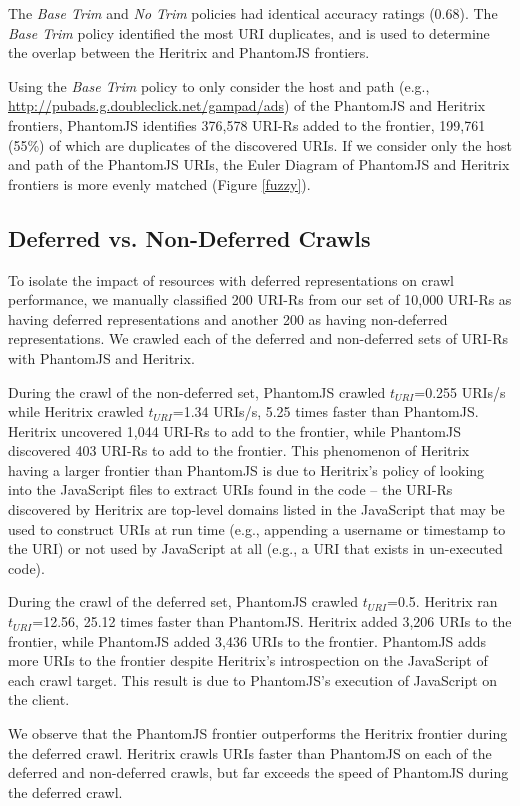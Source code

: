 \documentclass{ipres_proc_article-sp}
\begin{document}
The \emph{Base Trim} and \emph{No Trim} policies had identical accuracy ratings (0.68). The \emph{Base Trim} policy identified the most URI duplicates, and is used to determine the overlap between the Heritrix and PhantomJS frontiers.

Using the \emph{Base Trim} policy to only consider the host and path (e.g., \url{http://pubads.g.doubleclick.net/gampad/ads}) of the PhantomJS and Heritrix frontiers, PhantomJS identifies 376,578 URI-Rs added to the frontier, 199,761 (55\%) of which are duplicates of the discovered URIs. If we consider only the host and path of the PhantomJS URIs, the Euler Diagram of PhantomJS and Heritrix frontiers is more evenly matched (Figure \ref{fuzzy}).


\subsection{Deferred vs. Non-Deferred Crawls}
\label{deferVnon}
To isolate the impact of resources with deferred representations on crawl performance, we manually classified 200 URI-Rs from our set of 10,000 URI-Rs as having deferred representations and another 200 as having non-deferred representations. We crawled each of the deferred and non-deferred sets of URI-Rs with PhantomJS and Heritrix. 

During the crawl of the non-deferred set, PhantomJS crawled $t_{URI}$=0.255 URIs/s while Heritrix crawled $t_{URI}$=1.34 URIs/s, 5.25 times faster than PhantomJS. Heritrix uncovered 1,044 URI-Rs to add to the frontier, while PhantomJS discovered 403 URI-Rs to add to the frontier. This phenomenon of Heritrix having a larger frontier than PhantomJS is due to Heritrix's policy of looking into the JavaScript files to extract URIs found in the code -- the URI-Rs discovered by Heritrix are top-level domains listed in the JavaScript that may be used to construct URIs at run time (e.g., appending a username or timestamp to the URI) or not used by JavaScript at all (e.g., a URI that exists in un-executed code). 

During the crawl of the deferred set, PhantomJS crawled $t_{URI}$=0.5. Heritrix ran $t_{URI}$=12.56, 25.12 times faster than PhantomJS. Heritrix added 3,206 URIs to the frontier, while PhantomJS added 3,436 URIs to the frontier. PhantomJS adds more URIs to the frontier despite Heritrix's introspection on the JavaScript of each crawl target. This result is due to PhantomJS's execution of JavaScript on the client.

We observe that the PhantomJS frontier outperforms the Heritrix frontier during the deferred crawl. Heritrix crawls URIs faster than PhantomJS on each of the deferred and non-deferred crawls, but far exceeds the speed of PhantomJS during the deferred crawl.
\end{document}
